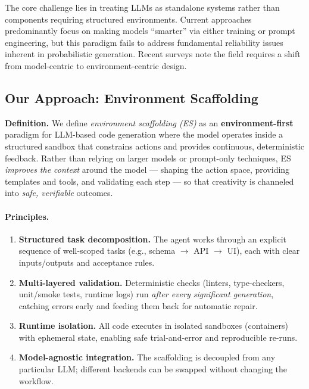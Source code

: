 \documentclass{article}
\begin{document}
The core challenge lies in treating LLMs as standalone systems rather than components requiring structured environments. Current approaches predominantly focus on making models ``smarter'' via either training or prompt engineering, but this paradigm fails to address fundamental reliability issues inherent in probabilistic generation. Recent surveys \citep{jiang2024survey,paul2024benchmarks} note the field requires a shift from model-centric to environment-centric design.

\subsection{Our Approach: Environment Scaffolding}

\textbf{Definition.} We define \emph{environment scaffolding (ES)} as an \textbf{environment-first} paradigm for LLM-based code generation where the model operates inside a structured sandbox that constrains actions and provides continuous, deterministic feedback. Rather than relying on larger models or prompt-only techniques, ES \emph{improves the context} around the model --- shaping the action space, providing templates and tools, and validating each step --- so that creativity is channeled into \emph{safe, verifiable} outcomes.

\paragraph{Principles.}
\begin{enumerate}
  \item \textbf{Structured task decomposition.} The agent works through an explicit sequence of well-scoped tasks (e.g., schema $\rightarrow$ API $\rightarrow$ UI), each with clear inputs/outputs and acceptance rules.
  \item \textbf{Multi-layered validation.} Deterministic checks (linters, type-checkers, unit/smoke tests, runtime logs) run \emph{after every significant generation}, catching errors early and feeding them back for automatic repair.
  \item \textbf{Runtime isolation.} All code executes in isolated sandboxes (containers) with ephemeral state, enabling safe trial-and-error and reproducible re-runs.
  \item \textbf{Model-agnostic integration.} The scaffolding is decoupled from any particular LLM; different backends can be swapped without changing the workflow.
\end{enumerate}
\end{document}
